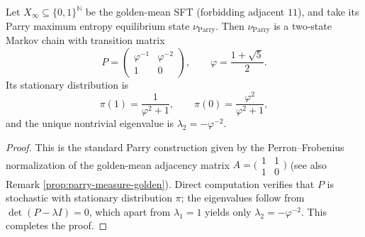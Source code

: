 \begin{theorem}\label{thm:pom-parry-limit-chain-explicit}
Let \(X_\infty\subseteq\{0,1\}^{\mathbb N}\) be the golden-mean SFT (forbidding adjacent \(11\)), and take its Parry maximum entropy equilibrium state \(\nu_{\mathrm{Parry}}\).
Then \(\nu_{\mathrm{Parry}}\) is a two-state Markov chain with transition matrix
\[
P=\begin{pmatrix}
\varphi^{-1} & \varphi^{-2}\\
1 & 0
\end{pmatrix},
\qquad \varphi=\frac{1+\sqrt5}{2}.
\]
Its stationary distribution is
\[
\pi(1)=\frac{1}{\varphi^2+1},\qquad
\pi(0)=\frac{\varphi^2}{\varphi^2+1},
\]
and the unique nontrivial eigenvalue is \(\lambda_2=-\varphi^{-2}\).
\end{theorem}
\begin{proof}
This is the standard Parry construction given by the Perron--Frobenius normalization of the golden-mean adjacency matrix \(A=\bigl(\begin{smallmatrix}1&1\\1&0\end{smallmatrix}\bigr)\) (see also Remark \ref{prop:parry-measure-golden}).
Direct computation verifies that \(P\) is stochastic with stationary distribution \(\pi\); the eigenvalues follow from \(\det(P-\lambda I)=0\), which apart from \(\lambda_1=1\) yields only \(\lambda_2=-\varphi^{-2}\). This completes the proof.
\end{proof}


